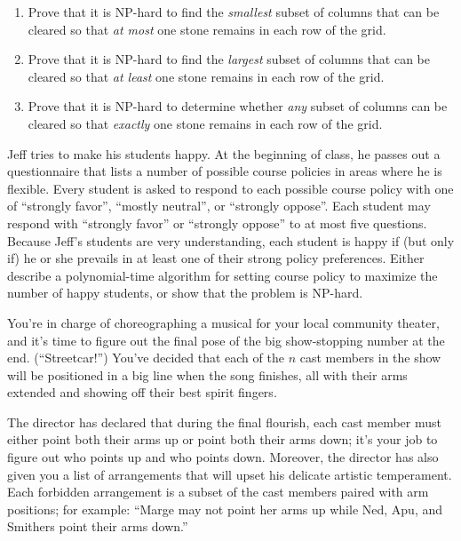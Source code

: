 \begin{exercises}
\begin{enumerate}
\item Prove that it is NP-hard to find the \textit{smallest} subset of columns that can be cleared so that \textit{at most} one stone remains in each row of the grid.

\item Prove that it is NP-hard to find the \textit{largest} subset of columns that can be cleared so that \textit{at least} one stone remains in each row of the grid.

\item {} Prove that it is NP-hard to determine whether \textit{any} subset of columns can be cleared so that \textit{exactly} one stone remains in each row of the grid.

\end{enumerate}

\item Jeff tries to make his students happy. At the beginning of class, he passes out a questionnaire that lists a number of possible course policies in areas where he is flexible. Every student is asked to respond to each possible course policy with one of “strongly favor”, “mostly neutral”, or “strongly oppose”. Each student may respond with “strongly favor” or “strongly oppose” to at most five questions. Because Jeff’s students are very understanding, each student is happy if (but only if) he or she prevails in at least one of their strong policy preferences. Either describe a polynomial-time algorithm for setting course policy to maximize the number of happy students, or show that the problem is NP-hard.

\item You’re in charge of choreographing a musical for your local community theater, and it’s time to figure out the final pose of the big show-stopping number at the end. (“Streetcar!”) You’ve decided that each of the $n$ cast members in the show will be positioned in a big line when the song finishes, all with their arms extended and showing off their best spirit fingers.

The director has declared that during the final flourish, each cast member must either point both their arms up or point both their arms down; it’s your job to figure out who points up and who points down. Moreover, the director has also given you a list of arrangements that will upset his delicate artistic temperament. Each forbidden arrangement is a subset of the cast members paired with arm positions; for example: “Marge may not point her arms up while Ned, Apu, and Smithers point their arms down.”


\end{exercises}
